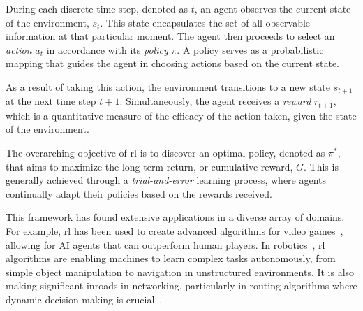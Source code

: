 During each discrete time step, 
 denoted as $t$, 
an agent observes the current state of the environment, $s_t$. 
This state encapsulates the set of all observable information at that particular moment. 
The agent then proceeds to select an \emph{action} $a_t$ in accordance with its \emph{policy} $\pi$. 
A policy serves as a probabilistic mapping that guides the agent in choosing actions based on the current state.

As a result of taking this action, 
 the environment transitions to a new state $s_{t+1}$ at the next time step $t+1$. 
 Simultaneously, the agent receives a \emph{reward} $r_{t+1}$, which is a quantitative measure of the efficacy of the action taken, given the state of the environment.

The overarching objective of \ac{rl} is to discover an optimal policy, denoted as $\pi^*$, that aims to maximize the long-term return, or cumulative reward, $G$. This is generally achieved through a \emph{trial-and-error} learning process, where agents continually adapt their policies based on the rewards received.

This framework has found extensive applications in a diverse array of domains. For example, \ac{rl} has been used to create advanced algorithms for video games~\cite{DBLP:journals/spm/ArulkumaranDBB17}, allowing for AI agents that can outperform human players. In robotics~\cite{DBLP:journals/ijrr/KoberBP13}, \ac{rl} algorithms are enabling machines to learn complex tasks autonomously, from simple object manipulation to navigation in unstructured environments. It is also making significant inroads in networking, particularly in routing algorithms where dynamic decision-making is crucial~\cite{DBLP:journals/comsur/LuongHGNWLK19}.
